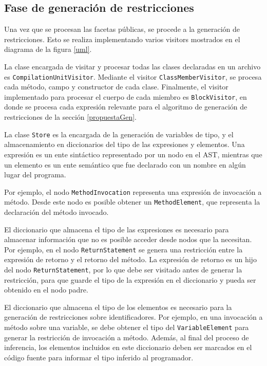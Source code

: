 \subsection{Fase de generación de restricciones}
Una vez que se procesan las facetas públicas, se procede a la generación de restricciones. Esto se realiza implementando varios visitors mostrados en el diagrama de la figura \ref{uml}.

La clase encargada de visitar y procesar todas las clases declaradas en un archivo es \texttt{CompilationUnitVisitor}. Mediante el visitor \texttt{ClassMemberVisitor}, se procesa cada método, campo y constructor de cada clase. Finalmente, el visitor implementado para procesar el cuerpo de cada miembro es \texttt{BlockVisitor}, en donde se procesa cada expresión relevante para el algoritmo de generación de restricciones de la sección \ref{propuestaGen}.

La clase \texttt{Store} es la encargada de la generación de variables de tipo, y el almacenamiento en diccionarios del tipo de las expresiones y elementos. Una expresión es un ente sintáctico representado por un nodo en el AST, mientras que un elemento es un ente semántico que fue declarado con un nombre en algún lugar del programa.

Por ejemplo, el nodo \texttt{MethodInvocation} representa una expresión de invocación a método. Desde este nodo es posible obtener un \texttt{MethodElement}, que representa la declaración del método invocado.

El diccionario que almacena el tipo de las expresiones es necesario para almacenar información que no es posible acceder desde nodos que la necesitan. Por ejemplo, en el nodo \texttt{ReturnStatement} se genera una restricción entre la expresión de retorno y el retorno del método. La expresión de retorno es un hijo del nodo \texttt{ReturnStatement}, por lo que debe ser visitado antes de generar la restricción, para que guarde el tipo de la expresión en el diccionario y pueda ser obtenido en el nodo padre.

El diccionario que almacena el tipo de los elementos es necesario para la generación de restricciones sobre identificadores. Por ejemplo, en una invocación a método sobre una variable, se debe obtener el tipo del \texttt{VariableElement} para generar la restricción de invocación a método. Además, al final del proceso de inferencia, los elementos incluidos en este diccionario deben ser marcados en el código fuente para informar el tipo inferido al programador.


